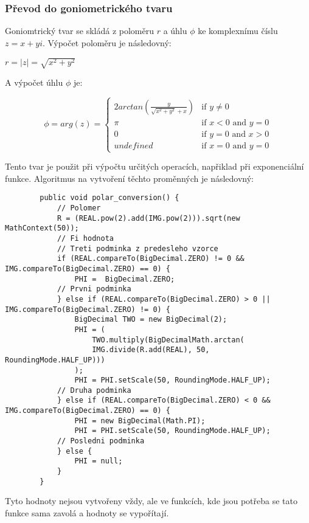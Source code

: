 \documentclass{article}
\begin{document}
    \subsubsection{Převod do goniometrického tvaru}
    Goniomtrický tvar se skládá z poloměru $r$ a úhlu $\phi$ ke komplexnímu číslu $z = x+yi$. Výpočet poloměru je následovný:
    \newline
    \begin{center}
        $r = |z| = \sqrt{x^2+y^2}$
    \end{center}
    A výpočet úhlu $\phi$ je:
    \begin{center}
        \begin{equation*}
            \phi = arg(z) = \begin{cases}
                2arctan(\frac{y}{\sqrt{x^2+y^2}+x}) & \text{if $y \neq 0$}\\
                \pi & \text{if $x < 0$ and $y = 0$}\\
                0 & \text{if $y = 0$ and $x > 0$}\\
                undefined & \text{if $x = 0$ and $y = 0$}
            \end{cases}
        \end{equation*}
    \end{center}
    Tento tvar je použit při výpočtu určitých operacích, napřiklad při exponenciální funkce.
    \newline
    Algoritmus na vytvoření těchto proměnných je následovný:
    \begin{lstlisting}
        public void polar_conversion() {
            // Polomer
            R = (REAL.pow(2).add(IMG.pow(2))).sqrt(new MathContext(50));
            // Fi hodnota
            // Treti podminka z predesleho vzorce
            if (REAL.compareTo(BigDecimal.ZERO) != 0 && IMG.compareTo(BigDecimal.ZERO) == 0) {
                PHI =  BigDecimal.ZERO;
            // Prvni podminka
            } else if (REAL.compareTo(BigDecimal.ZERO) > 0 || IMG.compareTo(BigDecimal.ZERO) != 0) {
                BigDecimal TWO = new BigDecimal(2);
                PHI = (
                    TWO.multiply(BigDecimalMath.arctan(
                    IMG.divide(R.add(REAL), 50, RoundingMode.HALF_UP)))
                );
                PHI = PHI.setScale(50, RoundingMode.HALF_UP);
            // Druha podminka
            } else if (REAL.compareTo(BigDecimal.ZERO) < 0 && IMG.compareTo(BigDecimal.ZERO) == 0) {
                PHI = new BigDecimal(Math.PI);
                PHI = PHI.setScale(50, RoundingMode.HALF_UP);
            // Posledni podminka
            } else {
                PHI = null;
            }
        }
    \end{lstlisting}
    Tyto hodnoty nejsou vytvořeny vždy, ale ve funkcích, kde jsou potřeba se tato funkce sama zavolá a
    hodnoty se vypořítají.
\end{document}
